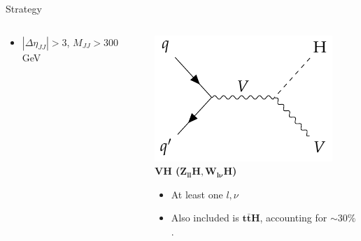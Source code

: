 \documentclass[9pt,aspectratio=1610]{beamer}
\begin{document}
\begin{frame}{Strategy}
\begin{itemize}
\begin{columns}
\begin{column}{0.31\textwidth}
\begin{itemize}
					\item \(|\Delta\eta_{JJ}| > 3\), \(M_{JJ} > 300\) GeV
				\end{itemize}
			\end{column}
			\begin{column}{0.31\textwidth}
				\centering
				\includegraphics[height=0.25\textheight]{feynman-diagrams/VH.pdf}\\
				\textbf{VH (\(\mathbf{Z_{ll}H},\mathbf{W_{l\nu}H}\))}
				\begin{itemize}
					\item At least one \(l, \nu\)
					\item Also included is \(\mathbf{t\bar{t}H}\), accounting for \(\sim30\%\).
				\end{itemize}
			\end{column}
		\end{columns}
	\end{itemize}
\end{frame}
\end{document}
